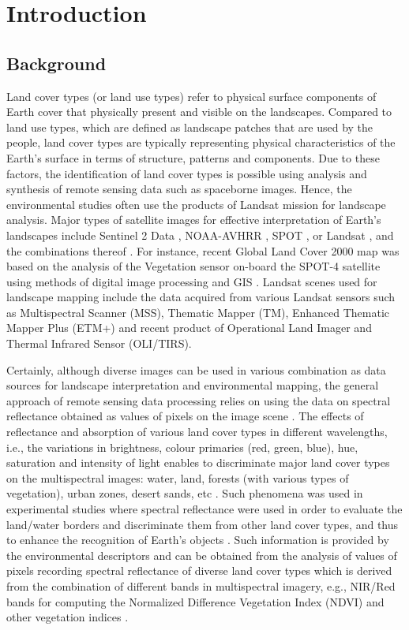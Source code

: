 \documentclass[earth,article,submit,pdftex,moreauthors]{Definitions/mdpi}
\begin{document}
\section{Introduction}

\subsection{Background}
Land cover types (or land use types) refer to physical surface components of Earth cover that physically present and visible on the landscapes. Compared to land use types, which are defined as landscape patches that are used by the people, land cover types are typically representing physical characteristics of the Earth's surface in terms of structure, patterns and components. Due to these factors, the identification of land cover types is possible using analysis and synthesis of remote sensing data such as spaceborne images. Hence, the environmental studies often use the products of Landsat mission for landscape analysis. Major types of satellite images for effective interpretation of Earth's landscapes include Sentinel 2 Data \cite{Ngom,TONG2020111598}, NOAA-AVHRR \cite{KONARSKA2002491,ANYAMBA2005596,Frederiksen}, SPOT \cite{SILVA2005188,MARTINEZ2011152}, or Landsat \cite{PIMPLE2020118007,Lemenkova202315}, and the combinations thereof \cite{rs12193157}. For instance, recent Global Land Cover 2000 map was based on the analysis of the Vegetation sensor on-board the SPOT-4 satellite using methods of digital image processing and GIS \cite{Mayaux}. Landsat scenes used for landscape mapping include the data acquired from various Landsat sensors such as Multispectral Scanner (MSS), Thematic Mapper (TM), Enhanced Thematic Mapper Plus (ETM+) and recent product of Operational Land Imager and Thermal Infrared Sensor (OLI/TIRS).

Certainly, although diverse images can be used in various combination as data sources for landscape interpretation and environmental mapping, the general approach of remote sensing data processing relies on using the data on spectral reflectance obtained as values of pixels on the image scene \cite{ACKER2014}. The effects of reflectance and absorption of various land cover types in different wavelengths, i.e., the variations in brightness, colour primaries (red, green, blue), hue, saturation and intensity of light enables to discriminate major land cover types on the multispectral images: water, land, forests (with various types of vegetation), urban zones, desert sands, etc \cite{rs12101634}. Such phenomena was used in experimental studies where spectral reflectance were used in order to evaluate the land/water borders and discriminate them from other land cover types, and thus to enhance the recognition of Earth's objects \cite{rs13132454}. Such information is provided by the environmental descriptors and can be obtained from the analysis of values of pixels recording spectral reflectance of diverse land cover types which is derived from the combination of different bands in multispectral imagery, e.g., NIR/Red bands for computing the Normalized Difference Vegetation Index (NDVI) and other vegetation indices \cite{CRIPPEN199071,LI2004463,jmse11040871,RUAN2022157075}.
\end{document}
